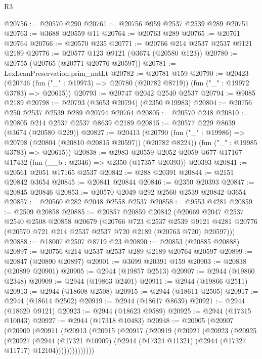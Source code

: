 \begin{lexlean}{R3}
\begin{coremodule}
@20756 := @20570 @290
@20761 := @20756 @959 @2537 @2539 @289 @20751
@20763 := @3688 @20559 @11
@20764 := @20763 @289
@20765 := @20761 @20764
@20766 := @20570 @235
@20771 := @20766 @214 @2537 @2537 @9121 @2189
@20776 := @20577 @123 @9121 (@3674 (@20580 @123))
@20780 := @20755 (@20765 (@20771 @20776 @20597))
@20781 := LexLeanPreservation.prim_natLt
@20782 := @20781 @159
@20790 := @20423
    (@20746 (fun ("_" : @19973) => @20780 (@20782 @8719)) (fun ("_" : @19972 @3783) => @20615))
@20793 := @20747 @2042 @2540 @2537
@20794 := @9085 @2189
@20798 := @20793 (@3653 @20794) (@2350 @19983)
@20804 := @20756 @250 @2537 @2539 @289 @20794 @20764
@20805 := @20570 @248
@20810 := @20805 @214 @2537 @2537 @8639 @2189
@20815 := @20577 @229 @8639 (@3674 (@20580 @229))
@20827 := @20413
    (@20790
      (fun ("_" : @19986) => @20798 (@20804 (@20810 @20815 @20597)) (@20782 @8224))
      (fun ("_" : @19985 @3783) => @20615))
@20838 := @2983
    @20559
    @2052
    @2059
    @677
    @17167
    @17432
    (fun (__b : @2346) => @2350 (@17357 @20393))
    @20393
@20841 := @20561 @2051 @17165 @2537
@20842 := @288 @20391
@20844 := @2151 @20842 @3654
@20845 := @20841 @20844
@20846 := @2350 @20393
@20847 := @20845 @20846
@20853 := @20570 @2049 @292 @2560 @2539 @20842 @3654
@20857 := @20560 @282 @2048 @2558 @2537
@20858 := @9553 @4281
@20859 := @2509 @20858
@20885 := @20857
    @20859
    @20842
    (@20669
      @2047
      @2537
      @2540
      @2508
      @20858
      @20679
      (@20766
        @723
        @2537
        @2539
        @9121
        @4281
        @20776
        (@20570 @721 @214 @2537 @2537 @720 @2189 (@20763 @720) @20597)))
@20888 := @18007 @2507 @8719 @23
@20890 := @20853 (@20885 @20888)
@20897 := @20756 @214 @2537 @2537 @289 @2189 @20764 @20597
@20899 := @20847 (@20890 @20897)
@20901 := @3699 @20391 @159
@20903 := @20838 (@20899 @20901)
@20905 := @2944 (@19857 @2513)
@20907 := @2944 (@19860 @2348)
@20909 := @2944 (@19863 @2401)
@20911 := @2944 (@19866 @2511)
@20913 := @2944 (@18608 @2508)
@20915 := @2944 (@18611 @2505)
@20917 := @2944 (@18614 @2502)
@20919 := @2944 (@18617 @8639)
@20921 := @2944 (@18620 @9121)
@20923 := @2944 (@18623 @9589)
@20925 := @2944 (@17315 @10043)
@20927 := @2944 (@17318 @10483)
@20948 := @20905
    (@20907
      (@20909
        (@20911
          (@20913
            (@20915
              (@20917
                (@20919
                  (@20921
                    (@20923
                      (@20925
                        (@20927
                          (@2944
                            (@17321 @10909)
                            (@2944 (@17324 @11321) (@2944 (@17327 @11717) @12104))))))))))))))

\end{coremodule}
\end{lexlean}
